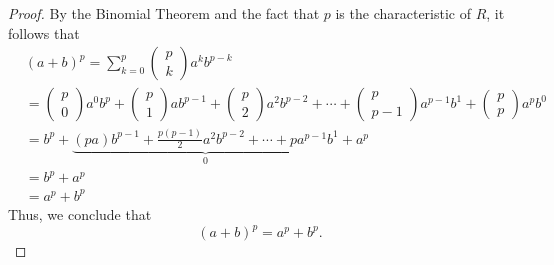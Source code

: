 \documentclass[a4paper]{article}
\begin{document}
\begin{problem}
\begin{enumerate}
            \begin{proof}
            By the Binomial Theorem and the fact that \(  p  \) is the characteristic of \( R  \), it follows that  
            \begin{align*}
                &(a + b)^{p} = \sum_{ k=0  }^{ p  } \begin{pmatrix} p \\ k  \end{pmatrix} a^{k} b^{p-k} \\
                            &= \begin{pmatrix} p \\ 0  \end{pmatrix}  a^{0} b^{p} + \begin{pmatrix} p \\ 1  \end{pmatrix} a b^{p-1} + \begin{pmatrix} p \\ 2   \end{pmatrix} a^{2} b^{p-2} + \cdots + \begin{pmatrix} p \\ p - 1  \end{pmatrix} a^{p-1} b^{1}  + \begin{pmatrix} p \\ p  \end{pmatrix}  a^{p} b^{0}  \\
                            &= b^{p} + \underbrace{(pa) b^{p-1} + \frac{ p (p-1) }{ 2 } a^{2} b^{p-2} + \cdots + p a^{p-1} b^{1}}_{0} + a^{p} \tag{\( R  \) has characteristic \( p \)}  \\
                            &= b^{p} + a^{p}  \\
                            &= a^{p} + b^{p} \tag{addition is commutative}
            \end{align*}
            Thus, we conclude that 
            \[  (a + b)^{p} = a^{p} + b^{p}. \]
            \end{proof}
   \end{enumerate}
\end{problem}
\end{document}
